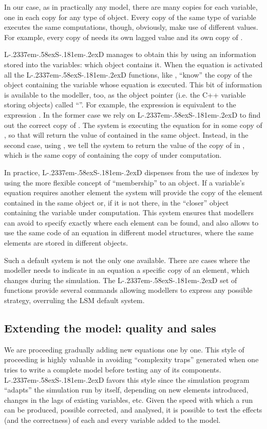 \documentclass [11pt,a4paper] {book}
\def\LsD{{L\kern-.2337em\lower-.58ex\hbox{S}\kern-.181em\lower-.2ex\hbox{D}}\xspace}
\begin{document}
 In our case, as in practically any model, there are many copies for each variable, one in each copy for any 
type of object. Every copy of the same type of variable executes the same computations, though, obviously, make use of different values. For example, every copy of  needs its own lagged value
and its own copy of .

\LsD manages to obtain this by using an information stored into the variables: which object contains it. When the
equation is activated all the \LsD functions, like , ``know'' the copy of
the object containing the variable whose equation is executed. This bit of information is
available to the modeller, too, as the object pointer (i.e. the C++ variable storing
objects) called ``''. For example, the expression  is equivalent to
the expression . In the former case we rely on \LsD to find out the
correct copy of . The system is executing the equation for  in
some copy of , so that  will return the value of 
contained in the same object. Instead, in the second case, using , we
tell the system to return the value of the copy of  in , which is the
same copy of  containing the copy of  under computation.

In practice, \LsD dispenses from the use of indexes by using the more flexible concept of ``membership'' to an object. If a variable's equation requires another element the system will provide the copy of the element contained in the same object or, if it is not there, in the ``closer'' object containing the variable under computation. This system ensures that modellers can avoid to specify exactly where each element can be found, and also allows to use the same code of an equation in different model structures, where the same elements are stored in different objects.

Such a default system is not the only one available. There are cases where the modeller needs to indicate in an equation a specific copy of an element, which changes during the simulation. The \LsD set of functions provide several commands allowing modellers to express any possible strategy, overruling the LSM default system.


\subsection{Extending the model: quality and sales }
We are proceeding gradually adding new equations one by one. This style of proceeding is highly valuable in avoiding ``complexity traps'' generated when one tries to write a complete model before testing any of its components. \LsD favors this style since the simulation program ``adapts'' the simulation run by itself, depending on new elements introduced, changes in the lags of existing variables, etc. Given the speed with which a run can be produced, possible corrected, and analysed, it is possible to test the effects (and the correctness) of each and every variable added to the model.
\end{document}
